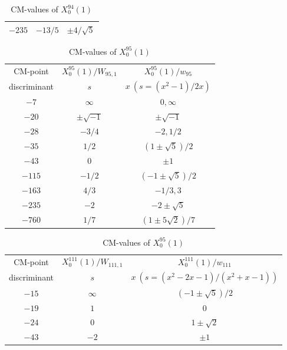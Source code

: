 \documentclass{amsart}
\theoremstyle{definition}
\begin{document}
\begin{appendices}
\begin{table}
\begin{tabular}{|c|c|c|}
${-235}$ & $-{13}/{5}$ & $\pm {4/\sqrt{5}}$  \\ \hline
\end{tabular}
\bigskip
\caption{CM-values of $X^{94}_0(1)$}
\end{table}



\clearpage



\renewcommand{\arraystretch}{1.5}
\tabcolsep=10pt                         
\begin{table}

\begin{tabular}{|c|c|c|}
\hline
CM-point& ${X_{0}^{95}(1)/W_{95,1}}$ & ${X_{0}^{95}(1)/w_{95}}$ \\ 
        discriminant  & $s$ & $x\ (s=(x^2-1)/2x)$  \\ \hline
${-7}$ & $\infty $ & $0, \infty $  \\ 

${-20}$ & $\pm \sqrt{-1}$ & $\pm \sqrt{-1}$  \\ 
${-28}$ & $-{3}/{4}$ & $-2,{1}/{2}$   \\ 
${-35}$ & ${1}/{2}$ & $(1\pm\sqrt{5})/{2}$  \\ 

${-43}$ & $0$ & $\pm 1$  \\ 
${-115}$ & $-{1}/{2}$ & $(-1\pm\sqrt{5})/{2}$   \\ 
${-163}$ & ${4}/{3}$ & $-{1}/{3},3$ 
\\ 
${-235}$ & $-2$ & $-2\pm\sqrt{5}$ \\ 
${-760}$ & ${1}/{7}$ & $(1\pm5\sqrt{2})/{7}$  \\ \hline

\end{tabular}
\bigskip
\caption{CM-values of $X^{95}_0(1)$}


\renewcommand{\arraystretch}{1.5}
\tabcolsep=10pt                         
\begin{tabular}{|c|c|c|}
\hline
CM-point& ${X_{0}^{111}(1)/W_{111,1}}$ & ${X_{0}^{111}(1)/w_{111}}$  \\
         discriminant & $s$ & $x\ (s=(x^2-2x-1)/(x^2+x-1))$ \\ \hline
${-15}$ & $\infty $ & $(-1\pm\sqrt{5})/{2} $  \\ 

${-19}$ & $1$ & $0$   \\ 
${-24}$ & $0$ & $1\pm\sqrt{2}$   \\ 
${-43}$ & $-2$ & $\pm1$  \\ 


\end{tabular}
\end{table}
\end{appendices}
\end{document}
